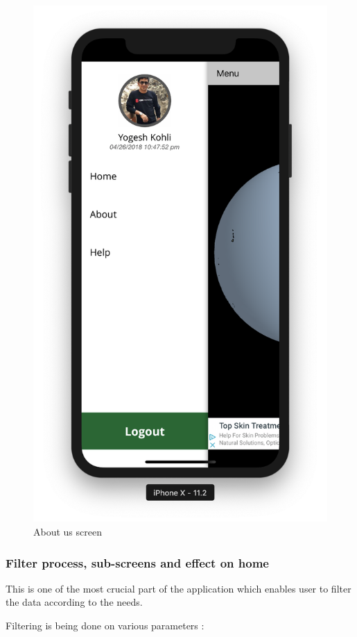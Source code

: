\begin{itemize}
        \begin{figure}[H]
            \centering
            \includegraphics[width=0.5\linewidth]{figures/ch2/side_menu.png}
            \caption{\label{fig:pass_recovery_1} About us screen}
        \end{figure}
        
            \newpage
            
    \end{itemize}

\subsubsection{Filter process, sub-screens and effect on home}

This is one of the most crucial part of the application which enables user to filter the data according to the needs.

Filtering is being done on various parameters :


